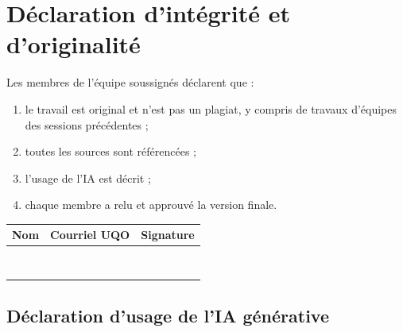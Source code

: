 \section{Déclaration d'intégrité et d'originalité}
\label{ann:integrite}

Les membres de l'équipe soussignés déclarent que :
\begin{enumerate}[label=\arabic*.]
  \item le travail est original et n'est pas un plagiat, y compris de travaux d'équipes des sessions précédentes ;
  \item toutes les sources sont référencées ;
  \item l'usage de l'IA est décrit ;
  \item chaque membre a relu et approuvé la version finale.
\end{enumerate}

{\renewcommand{\arraystretch}{1.3}
\begin{tabularx}{\linewidth}{@{}p{4.5cm}Xp{4cm}@{}}
\toprule
\textbf{Nom} & \textbf{Courriel UQO} & \textbf{Signature} \\
\midrule
\rule{0pt}{2em} & & \\ \midrule
\rule{0pt}{2em} & & \\ \midrule
\rule{0pt}{2em} & & \\ \midrule
\rule{0pt}{2em} & & \\ \midrule
\rule{0pt}{2em} & & \\ \midrule
\rule{0pt}{2em} & & \\ \midrule
\rule{0pt}{2em} & & \\ \midrule
\rule{0pt}{2em} & & \\
\bottomrule
\end{tabularx}}

\subsection*{Déclaration d'usage de l'IA générative}
\label{ann:ia}

